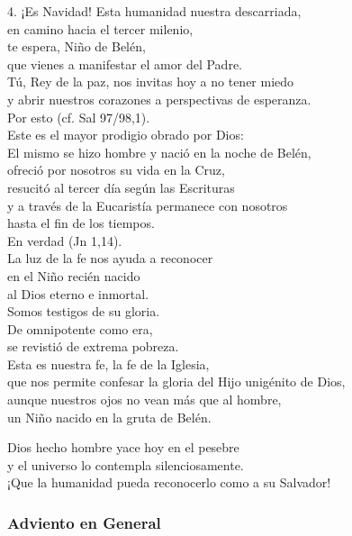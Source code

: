 4. ¡Es Navidad! Esta humanidad nuestra descarriada,\\ en camino hacia el tercer milenio,\\ te espera, Niño de Belén,\\ que vienes a manifestar el amor del Padre.\\ Tú, Rey de la paz, nos invitas hoy a no tener miedo\\ y abrir nuestros corazones a perspectivas de esperanza.\\ Por esto  (cf. Sal 97/98,1).\\ Este es el mayor prodigio obrado por Dios:\\ El mismo se hizo hombre y nació en la noche de Belén,\\ ofreció por nosotros su vida en la Cruz,\\ resucitó al tercer día según las Escrituras\\ y a través de la Eucaristía permanece con nosotros\\ hasta el fin de los tiempos.\\ En verdad  (Jn 1,14).\\ La luz de la fe nos ayuda a reconocer\\ en el Niño recién nacido\\ al Dios eterno e inmortal.\\ Somos testigos de su gloria.\\ De omnipotente como era,\\ se revistió de extrema pobreza.\\ Esta es nuestra fe, la fe de la Iglesia,\\ que nos permite confesar la gloria del Hijo unigénito de Dios,\\ aunque nuestros ojos no vean más que al hombre,\\ un Niño nacido en la gruta de Belén.

Dios hecho hombre yace hoy en el pesebre\\ y el universo lo contempla silenciosamente.\\ ¡Que la humanidad pueda reconocerlo como a su Salvador!

\subsubsection{Adviento en General}

